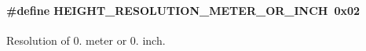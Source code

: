 \paragraph[{\texorpdfstring{H\+E\+I\+G\+H\+T\+\_\+\+R\+E\+S\+O\+L\+U\+T\+I\+O\+N\+\_\+005\+M\+E\+T\+E\+R\+\_\+\+O\+R\+\_\+05\+I\+N\+CH}{HEIGHT_RESOLUTION_005METER_OR_05INCH}}]{\setlength{\rightskip}{0pt plus 5cm}\#define H\+E\+I\+G\+H\+T\+\_\+\+R\+E\+S\+O\+L\+U\+T\+I\+O\+N\+\_\+M\+E\+T\+E\+R\+\_\+\+O\+R\+\_\+I\+N\+CH~0x02}\hypertarget{group___h_e_i_g_h_t___r_e_s_o_l_u_t_i_o_n_ga08ce7291c62e7c4cbcec4e5648f9728d}{}\label{group___h_e_i_g_h_t___r_e_s_o_l_u_t_i_o_n_ga08ce7291c62e7c4cbcec4e5648f9728d}
Resolution of 0. meter or 0. inch. 